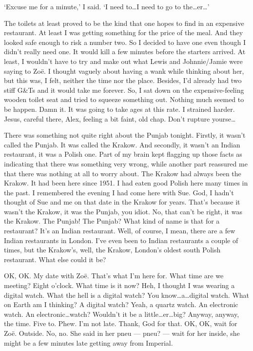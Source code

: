 `Excuse me for a minute,' I said. `I need to\dots I need to go to the\dots er\dots'

The toilets at least proved to be the kind that one hopes to find in
an expensive restaurant. At least I was getting something for the
price of the meal. And they looked safe enough to risk a number two. So I decided to have one even though I didn't really
need one. It would kill a few minutes before the starters arrived.
At least, I wouldn't have to try and make out what Lewis and
Johnnie/Jamie were saying to Zoë. I thought vaguely about having
a wank while thinking about her, but this was, I felt, neither the
time nor the place. Besides, I'd already had two stiff G\&Ts and it
would take me {\twelveit forever}. So, I sat down on the
expensive-feeling wooden toilet seat and tried to squeeze something
out. Nothing much seemed to be happen. Damn it. It was going to take
ages at this rate. I strained harder. Jesus, careful there, Alex,
feeling a bit faint, old chap. Don't rupture yourse\dots

\vskip 1cm

{\parindent=0pt
There was something not quite right about the Punjab tonight.
Firstly, it wasn't called the Punjab. It was called the Krakow. And
secondly, it wasn't an Indian restaurant, it was a Polish one. Part of my brain kept flagging up those facts as indicating that there was
something very wrong, while another part reassured me that there
was nothing at all to worry about. The Krakow had always been the Krakow.
It had been here since 1951. I had eaten good Polish here many times in the past. I remembered the evening I had come here with Sue. God, I
hadn't thought of Sue and me on that date in the Krakow for years.
That's because it wasn't the Krakow, it was the Punjab, you idiot.
No, that can't be right, it was the Krakow. The Punjab! The Punjab?
What kind of name is that for a restaurant? It's an Indian
restaurant. Well, of course, I mean, there are a few Indian
restaurants in London. I've even been to Indian restaurants a couple
of times, but the Krakow's, well, the Krakow, London's oldest south Polish restaurant. What else could it be?}

OK, OK. My date with Zoë. That's what I'm here for. What time
are we meeting? Eight o'clock. What time is it now? Heh, I
thought I was wearing a digital watch. What the hell is a {\twelveit
digital\/} watch? You know\dots a\dots digital watch. What on Earth
am I thinking? A digital watch? Yeah, a quartz watch. An electronic
watch. An electronic\dots {\twelveit watch?} Wouldn't it be a
little\dots er\dots big? Anyway, anyway, the time. Five to. Phew.
I'm not late. Thank, God for that. OK, OK, wait for Zoë.
Outside. No, no. She said in her pneu --- {\twelveit pneu?} --- wait
for her inside, she might be a few minutes late getting away from Imperial.

